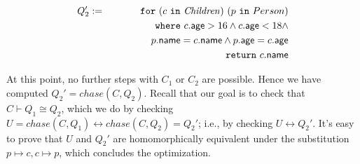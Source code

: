 \documentclass[preprint]{sigplanconf}
\newcommand{\FOR}{{\tt for} \ }
\newcommand{\WHERE}{{\tt where} \ }
\newcommand{\IN}{ \ {\tt in} \ }
\newcommand{\RETURN}{{\tt return} \ }
\newcommand{\relation}[1]{\ensuremath{\mathit{#1}}\xspace}
\begin{document}
\begin{eqnarray*}
Q_2' & := & \FOR (c \IN \relation{Children}) \ (p \IN Person) \\
 & & \WHERE c.{\sf age} > 16 \wedge c.{\sf age} < 18 \wedge \\
 & & \ \ \ \ \ \ \ \ \ \ \ \   p.{\sf name} = c.{\sf name} \wedge p.{\sf age} = c.{\sf age}\\
  & & \RETURN c.{\sf name}
\end{eqnarray*}  

At this point, no further steps with $C_1$ or $C_2$ are possible.
Hence we have computed $Q_2' = chase(C, Q_2)$.
Recall that our goal is to check that $C \vdash Q_1 \cong Q_2$, which we do by checking $U = chase(C, Q_1) \leftrightarrow chase(C, Q_2) = Q_2'$; i.e., by checking $U \leftrightarrow Q_2'$.
It's easy to prove that $U$ and $Q_2'$ are homomorphically equivalent under the substitution $p \mapsto c, c \mapsto p$, which concludes the optimization.

%
%
\end{document}
